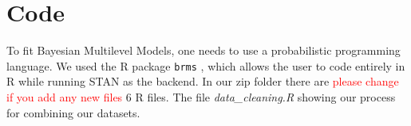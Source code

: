 \documentclass[12pt]{article}
\newcommand{\red}[1]{\textcolor{red}{#1}}
\newcommand{\blue}[1]{\textcolor{blue}{#1}}
\begin{document}



\section{Code}











To fit Bayesian Multilevel Models, one needs to use a probabilistic programming language. We used the R package \verb|brms| \parencite{brms}, which allows the user to code entirely in R while running STAN as the backend. In our zip folder there are \red{please change if you add any new files} 6 R files. The file \textit{data\_cleaning.R} showing our process for combining our datasets.
\end{document}
